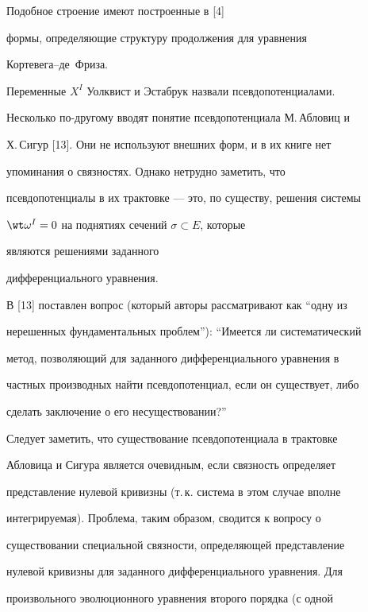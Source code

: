  


Подобное строение имеют построенные в [4] 


формы, определяющие структуру продолжения для уравнения 


Кортевега--де~Фриза. 


Переменные $X^I$ Уолквист и Эстабрук назвали псевдопотенциалами. 


 


Несколько по-другому вводят понятие псевдопотенциала М.\,Абловиц и 


Х.\,Сигур [13]. Они не используют внешних форм, и в их книге нет 


упоминания о связностях. Однако нетрудно заметить, что 


псевдопотенциалы в их трактовке --- это, по существу, решения системы 


$\wt\omega^I=0$ на поднятиях сечений $\sigma\subset E$, которые 


являются решениями заданного 


дифференциального уравнения. 


 


В [13] поставлен вопрос (который авторы рассматривают как ``одну из 


нерешенных фундаментальных проблем''): ``Имеется ли систематический 


метод, позволяющий для заданного дифференциального уравнения в 


частных производных найти псевдопотенциал, если он существует, либо 


сделать заключение о его несуществовании?'' 


 


Следует заметить, что существование псевдопотенциала в трактовке 


Абловица и Сигура является очевидным, если связность определяет 


представление нулевой кривизны (т.\,к. система в этом случае вполне 


интегрируемая). Проблема, таким образом, сводится к вопросу о 


существовании специальной связности, определяющей представление 


нулевой кривизны для заданного дифференциального уравнения. Для 


произвольного эволюционного уравнения второго порядка (с одной 


